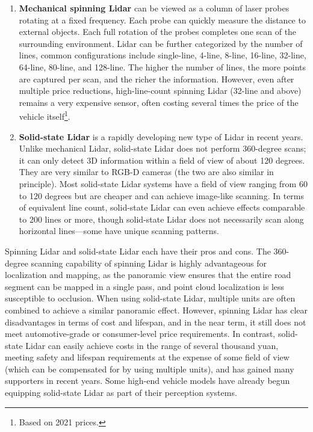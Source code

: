 \begin{enumerate}  
	\item \textbf{Mechanical spinning Lidar} can be viewed as a column of laser probes rotating at a fixed frequency. Each probe can quickly measure the distance to external objects.  
	Each full rotation of the probes completes one scan of the surrounding environment. Lidar can be further categorized by the number of lines, common configurations include single-line, 4-line, 8-line, 16-line, 32-line, 64-line, 80-line, and 128-line. The higher the number of lines, the more points are captured per scan, and the richer the information. However, even after multiple price reductions, high-line-count spinning Lidar (32-line and above) remains a very expensive sensor, often costing several times the price of the vehicle itself\footnote{Based on 2021 prices.}.  
	\item \textbf{Solid-state Lidar} is a rapidly developing new type of Lidar in recent years. Unlike mechanical Lidar, solid-state Lidar does not perform 360-degree scans; it can only detect 3D information within a field of view of about 120 degrees. They are very similar to RGB-D cameras (the two are also similar in principle). Most solid-state Lidar systems have a field of view ranging from 60 to 120 degrees but are cheaper and can achieve image-like scanning. In terms of equivalent line count, solid-state Lidar can even achieve effects comparable to 200 lines or more, though solid-state Lidar does not necessarily scan along horizontal lines—some have unique scanning patterns.  
\end{enumerate}  

Spinning Lidar and solid-state Lidar each have their pros and cons. The 360-degree scanning capability of spinning Lidar is highly advantageous for localization and mapping, as the panoramic view ensures that the entire road segment can be mapped in a single pass, and point cloud localization is less susceptible to occlusion. When using solid-state Lidar, multiple units are often combined to achieve a similar panoramic effect. However, spinning Lidar has clear disadvantages in terms of cost and lifespan, and in the near term, it still does not meet automotive-grade or consumer-level price requirements. In contrast, solid-state Lidar can easily achieve costs in the range of several thousand yuan, meeting safety and lifespan requirements at the expense of some field of view (which can be compensated for by using multiple units), and has gained many supporters in recent years. Some high-end vehicle models have already begun equipping solid-state Lidar as part of their perception systems.  

